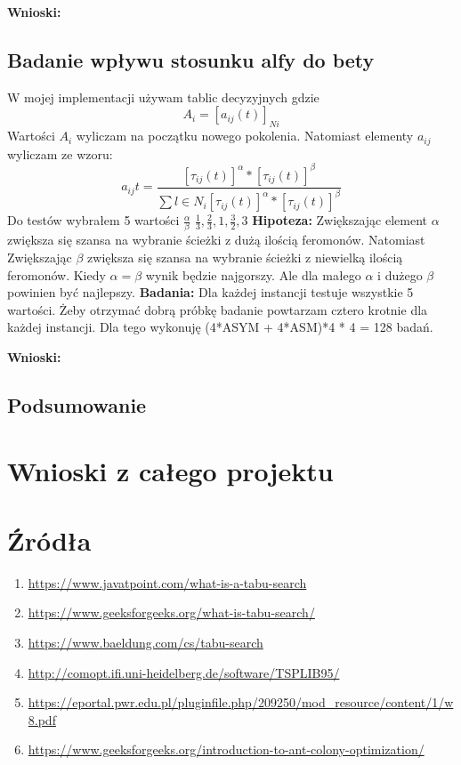 \documentclass{article}
\begin{document}
        \textbf{Wnioski: } 
      \subsection{Badanie wpływu stosunku alfy do bety}
        W mojej implementacji używam tablic decyzyjnych gdzie \[ A_i = [a_{ij} (t)]_{Ni}\]
        Wartości $A_i$ wyliczam na początku nowego pokolenia. Natomiast elementy $a_{ij}$
        wyliczam ze wzoru:
        \[
            a_{ij}t = \frac{[\tau_{ij}(t)]^\alpha*[\tau_{ij}(t)]^\beta}{\sum{l\in N_i}[\tau_{ij}(t)]^\alpha*[\tau_{ij}(t)]^\beta}
        \]
        Do testów wybrałem 5 wartości $\frac{\alpha}{\beta}$ $\frac{1}{3},\frac{2}{3},1,\frac{3}{2},3$\linebreak
        \textbf{Hipoteza: } Zwiększając element $\alpha$ zwiększa się szansa na wybranie ścieżki z dużą 
        ilością feromonów. Natomiast Zwiększając $\beta$ zwiększa się szansa na wybranie ścieżki z niewielką
        ilością feromonów. Kiedy $\alpha = \beta$ wynik będzie najgorszy. Ale dla małego $\alpha$ i dużego
        $\beta$ powinien być najlepszy. \linebreak
        \textbf{Badania: } Dla każdej instancji testuje wszystkie 5 wartości. 
        Żeby otrzymać dobrą próbkę badanie powtarzam cztero krotnie dla każdej 
        instancji. Dla tego wykonuję (4*ASYM + 4*ASM)*4 * 4 = 128 badań.\linebreak
        
        \textbf{Wnioski: } 
      \subsection{Podsumowanie}

    \section{Wnioski z całego projektu}


    \section{Źródła}
      \begin{enumerate}[label=\arabic*.]
        \item \url{https://www.javatpoint.com/what-is-a-tabu-search}
        \item \url{https://www.geeksforgeeks.org/what-is-tabu-search/}
        \item \url{https://www.baeldung.com/cs/tabu-search}
        \item \url{http://comopt.ifi.uni-heidelberg.de/software/TSPLIB95/} \label{src:TspLib}
        \item \url{https://eportal.pwr.edu.pl/pluginfile.php/209250/mod_resource/content/1/w8.pdf}
        \item \url{https://www.geeksforgeeks.org/introduction-to-ant-colony-optimization/}
      \end{enumerate}
\end{document}
